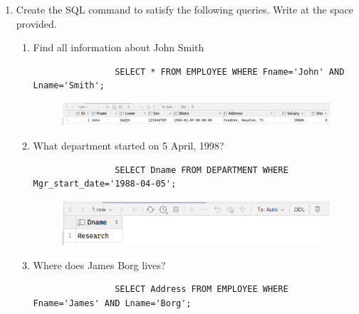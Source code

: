 \documentclass[12pt,titlepage]{article}
\begin{document}
\begin{enumerate}[label=\Alph*.]
    \item {
        Create the SQL command to satisfy the following queries. Write at the space provided.

        \begin{enumerate}[label={\arabic*.}]
            \item {
                Find all information about John Smith

                \begin{verbatim}
                SELECT * FROM EMPLOYEE WHERE Fname='John' AND Lname='Smith';
                \end{verbatim}

                \begin{figure}[h]
                    \centering
                    \includegraphics[width=.7\textwidth]{./images/output_1.png}
                \end{figure}
            }
            \pagebreak
            \item {
                What department started on 5 April, 1998?

                \begin{verbatim}
                SELECT Dname FROM DEPARTMENT WHERE Mgr_start_date='1988-04-05';
                \end{verbatim}

                \begin{figure}[h]
                    \centering
                    \includegraphics[width=.7\textwidth]{./images/output_2.png}
                \end{figure}
            }   
            \item {
                Where does James Borg lives?

                \begin{verbatim}
                SELECT Address FROM EMPLOYEE WHERE Fname='James' AND Lname='Borg';
                \end{verbatim}

}
\end{enumerate}}
\end{enumerate}
\end{document}
